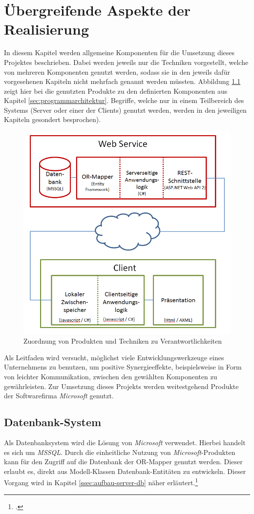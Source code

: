 \chapter{Übergreifende Aspekte der Realisierung}
\label{cha:realisierung}
In diesem Kapitel werden allgemeine Komponenten für die Umsetzung dieses Projektes beschrieben. Dabei werden jeweils nur die Techniken vorgestellt, welche von mehreren Komponenten genutzt werden, sodass sie in den jeweils dafür vorgesehenen Kapiteln nicht mehrfach genannt werden müssten. Abbildung \ref{pic:architecture-detailed} zeigt hier bei die genutzten Produkte zu den definierten Komponenten aus Kapitel \ref{sec:programmarchitektur}. Begriffe, welche nur in einem Teilbereich des Systems (Server oder einer der Clients) genutzt werden, werden in den jeweiligen Kapiteln gesondert besprochen).
\begin{figure}[!h]
\centering
\includegraphics[width=0.7\linewidth]{content/images/Aufbau-Architektur-detailliert.png}
\caption{Zuordnung von Produkten und Techniken zu Verantwortlichkeiten}
\label{pic:architecture-detailed}
\end{figure}
Als Leitfaden wird versucht, möglichst viele Entwicklungswerkzeuge eines Unternehmens zu benutzen, um positive Synergieeffekte, beispielsweise in Form von leichter Kommunikation, zwischen den gewählten Komponenten zu gewährleisten. Zur Umsetzung dieses Projekts werden weitestgehend Produkte der Softwarefirma \textit{Microsoft} genutzt.
\newpage
\section{Datenbank-System}
\label{sec:DB-System}
Als Datenbanksystem wird die Lösung von \textit{Microsoft} verwendet. Hierbei handelt es sich um \textit{\ac{MSSQL}}. Durch die einheitliche Nutzung von \textit{Microsoft}-Produkten kann für den Zugriff auf die Datenbank der \ac{OR-Mapper} genutzt werden. Dieser erlaubt es, direkt aus Modell-Klassen Datenbank-Entitäten zu entwickeln. Dieser Vorgang wird in Kapitel \ref{ssec:aufbau-server-db} näher erläutert.\footcite{online:SQLServer}
